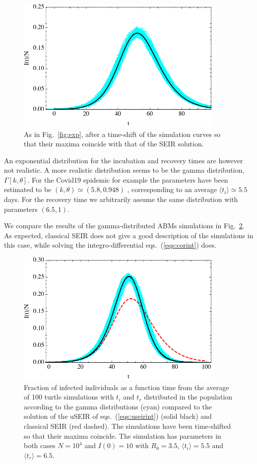 \documentclass[a4paper,oneside,11pt]{article}
\begin{document}
   \begin{figure}[h!]
  \centering
  \includegraphics[width=10cm]{expshift.pdf}
  \caption{ As in Fig.~\ref{fig:exp}, after a time-shift of the simulation curves so that their maxima coincide with that of the SEIR solution.  }
  \label{fig:expshift}
   \end{figure}

 An exponential distribution for the incubation and recovery times are however not realistic. A more realistic distribution seems to be the  gamma distribution, $\Gamma[k,\theta]$. For the Covid19 epidemic for example the parameters have been estimated to be $(k,\theta) \simeq (5.8, 0.948)$ \cite{}, corresponding to an average $\langle t_i\rangle \simeq 5.5$days. For the recovery time we arbitrarily assume the same distribution with parameters $(6.5,1)$.

We compare the results of the gamma-distributed ABMs simulations in Fig.~\ref{fig:expvsgamma}. As expected, classical SEIR does not give a good description of the simulations in this case, while solving the integro-differential eqs.~(\ref{eqs:corint}) does. 
\begin{figure}[h!]
  \centering
  \includegraphics[width=10cm]{GGvsSEIRshift.pdf}
  \caption{ Fraction of infected individuals as a function time from the average of 100 turtle simulations with $t_i$ and $t_r$ distributed in the population according to the gamma distributions (cyan) compared to the solution of the uSEIR of eqs.~(\ref{eqs:useirint}) (solid black) and classical SEIR (red dashed). The simulations have been time-shifted so that their maxima coincide. The simulation has parameters in both cases $N=10^4$ and $I(0)=10$ with $R_0=3.5$, $\langle t_i\rangle=5.5$ and $\langle t_r\rangle=6.5$.  }
  \label{fig:expvsgamma}
   \end{figure}
   
\end{document}
